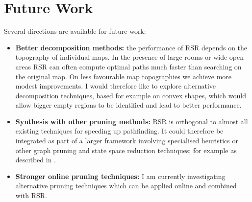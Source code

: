 \section{Future Work}
\label{sec:futurework}
Several directions are available for future work:
\begin{itemize}
\item{\textbf{Better decomposition methods:} the performance of RSR depends on the 
topography of individual maps. In the presence of large rooms or wide open 
areas RSR can often compute optimal paths much faster than searching on the original
map. On less favourable map topographies we achieve more modest improvements.
I would therefore like to explore alternative decomposition techniques, based
for example on convex shapes, which would allow bigger empty regions to be
identified and lead to better performance.}
\item{\textbf{Synthesis with other pruning methods:} RSR is orthogonal to almost
all existing techniques for speeding up pathfinding. It could therefore be
integrated as part of a larger framework involving specialised heuristics or
other graph pruning and state space reduction techniques; for example as
described in \cite{botea04,bjornsson05,bjornsson06}.}
\item{\textbf{Stronger online pruning techniques:} I am currently investigating
alternative pruning techniques which can be applied online and combined with RSR.
}
\end{itemize}
